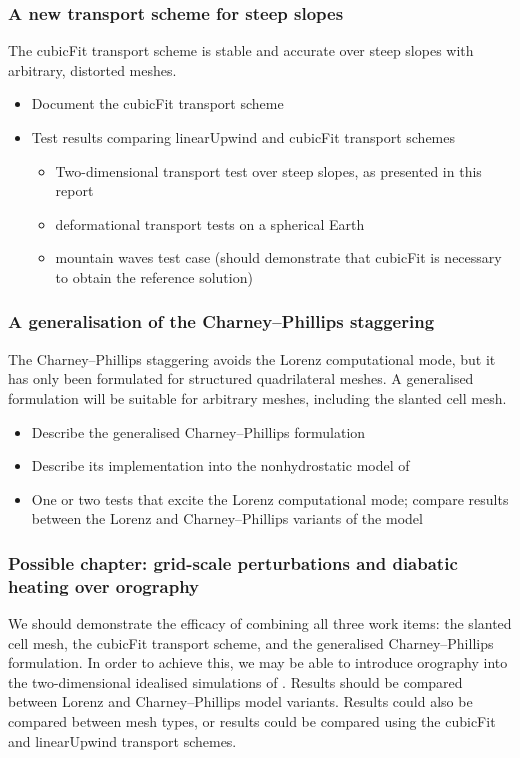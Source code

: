 \documentclass[a4paper,11pt]{article}
\begin{document}
\subsubsection*{A new transport scheme for steep slopes}
\noindent The cubicFit transport scheme is stable and accurate over steep slopes with arbitrary, distorted meshes.
\begin{itemize}[itemsep=0.1em]
	\item Document the cubicFit transport scheme
	\item {Test results comparing linearUpwind and cubicFit transport schemes
	\begin{itemize}[itemsep=0.1em,topsep=0pt]
		\item Two-dimensional transport test over steep slopes, as presented in this report
		\item \citet{lauritzen2012} deformational transport tests on a spherical Earth
		\item \citet{schaer2002} mountain waves test case (should demonstrate that cubicFit is necessary to obtain the reference solution)
	\end{itemize}}
\end{itemize}
	
\subsubsection*{A generalisation of the Charney--Phillips staggering}
\noindent The Charney--Phillips staggering avoids the Lorenz computational mode, but it has only been formulated for structured quadrilateral meshes.  A generalised formulation will be suitable for arbitrary meshes, including the slanted cell mesh.
\begin{itemize}[itemsep=0.1em]
	\item Describe the generalised Charney--Phillips formulation
	\item Describe its implementation into the nonhydrostatic model of \citet{weller-shahrokhi2014}
	\item One or two tests that excite the Lorenz computational mode; compare results between the Lorenz and Charney--Phillips variants of the model
\end{itemize}

\subsubsection*{Possible chapter: grid-scale perturbations and diabatic heating over orography}
\noindent We should demonstrate the efficacy of combining all three work items: the slanted cell mesh, the cubicFit transport scheme, and the generalised Charney--Phillips formulation.  In order to achieve this, we may be able to introduce orography into the two-dimensional idealised simulations of \citet{arakawa-konor1996}.
Results should be compared between Lorenz and Charney--Phillips model variants.  Results could also be compared between mesh types, or results could be compared using the cubicFit and linearUpwind transport schemes.
\end{document}
